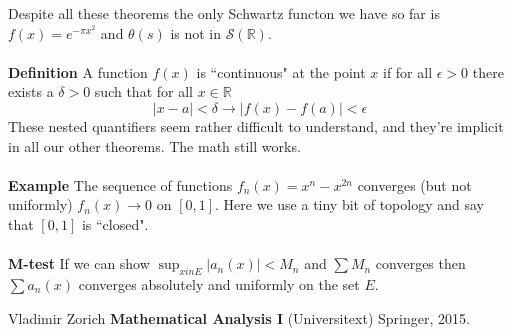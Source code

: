 \documentclass[12pt]{article}
\begin{document}
Despite all these theorems the only Schwartz functon we have so far is $f(x) = e^{- \pi x^2}$ and $\theta(s)$ is not in $\mathcal{S}(\mathbb{R})$. \\ \\
\textbf{Definition} A function $f(x)$ is ``continuous" at the point $x$ if for all $\epsilon > 0$ there exists a $\delta > 0$ such that for all $x \in \mathbb{R}$ 
$$ |x-a| < \delta \to |f(x) - f(a) | < \epsilon $$
These nested quantifiers seem rather difficult to understand, and they're implicit in all our other theorems.  The math still works.  \\ \\
\textbf{Example} The sequence of functions $f_n(x) = x^n - x^{2n}$ converges (but not uniformly) $f_n(x) \to 0$ on $[0,1]$.  Here we use a tiny bit of topology and say that $[0,1]$ is ``closed". \\ \\
\textbf{M-test} If we can show $\sup_{x in E} |a_n(x)| < M_n$ and $\sum M_n$ converges then $\sum a_n(x)$ converges absolutely and uniformly on the set $E$. 
\vfill
\begin{thebibliography}{} 
\item Vladimir Zorich \textbf{Mathematical Analysis I} (Universitext) Springer, 2015.
\end{thebibliography}
\end{document}
